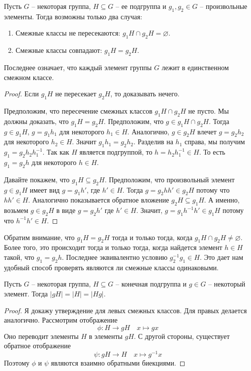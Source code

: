 \begin{claim}
\label{claim::cosets_disj}
Пусть $G$ -- некоторая группа, $H\subseteq G$ -- ее подгруппа и $g_1, g_2\in G$ -- произвольные элементы.
Тогда возможны только два случая:
\begin{enumerate}
\item Смежные классы не пересекаются: $g_1 H \cap g_2 H = \varnothing$.

\item Смежные классы совпадают: $g_1 H = g_2 H$.
\end{enumerate}
Последнее означает, что каждый элемент группы $G$ лежит в единственном смежном классе.
\end{claim}
\begin{proof}
Если $g_1H$ не пересекает $g_2H$, то доказывать нечего.

Предположим, что пересечение смежных классов $g_1 H\cap g_2 H$ не пусто.
Мы должны доказать, что $g_1 H = g_2 H$.
Предположим, что $g\in g_1 H \cap g_2H$.
Тогда $g\in g_1H$, $g = g_1 h_1$ для некоторого $h_1\in H$.
Аналогично, $g\in g_2H$ влечет $g = g_2 h_2$ для некоторого $h_2\in H$.
Значит $g_1 h_1 = g_2 h_2$.
Разделив на $h_1$ справа, мы получим $g_1 = g_2 h_2 h_1^{-1}$.
Так как $H$ является подгруппой, то $h = h_2 h_1^{-1}\in H$.
То есть $g_1 = g_2 h$  для некоторого $h\in H$.

Давайте покажем, что $g_1 H \subseteq g_2 H$.
Предположим, что произвольный элемент $g\in g_1H$ имеет вид $g = g_1 h'$, где $h'\in H$.
Тогда $g =g_2 h h'\in g_2 H$ потому что $hh'\in H$.
Аналогично показывается обратное вложение $g_2 H \subseteq g_1 H$.
А именно, возьмем $g\in g_2H$ в виде $g = g_2 h'$ где $h'\in H$.
Значит, $g = g_1 h^{-1}h'\in g_1 H$ потому что $h^{-1}h'\in H$.
\end{proof}

\begin{remark}
Обратим внимание, что $g_1 H  = g_2H$ тогда и только тогда, когда $g_1 H \cap g_2 H \neq \varnothing$.
Более того, это происходит тогда и только тогда, когда найдется элемент $h\in H$ такой, что $g_1 = g_2 h$.
Последнее эквивалентно условию $g_2^{-1}g_1 \in H$.
Это дает нам удобный способ проверять являются ли смежные классы одинаковыми.
\end{remark}

\begin{claim}
\label{claim::cosets_size}
Пусть $G$ -- некоторая группа, $H\subseteq G$ -- конечная подгруппа и $g\in G$ -- некоторый элемент.
Тогда $|gH| = |H| = |Hg|$.
\end{claim}
\begin{proof}
Я докажу утверждение для левых смежных классов.
Для правых делается аналогично.
Рассмотрим отображение
\[
\phi \colon H \to g H\quad x \mapsto gx
\]
Оно переводит элементы $H$ в элементы $gH$.
С другой стороны, существует обратное отображение
\[
\psi \colon gH \to H\quad x \mapsto g^{-1}x
\]
Поэтому $\phi$ и $\psi$ являются взаимно обратными биекциями.
\end{proof}


